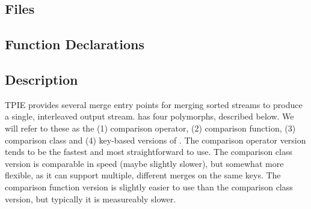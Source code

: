 
\subsection{Files}
  \btabb
     {}
  \etabb

\subsection{Function Declarations}
  \btabb
     {}
     {}
     {}
     {}
  \etabb

\subsection{Description}

TPIE provides several merge entry points for merging sorted streams to
produce a single, interleaved output stream.  has
four polymorphs, described below. We will refer to these as the (1)
comparison operator, (2) comparison function, (3) comparison class and (4) key-based
versions of . 
 The comparison operator version tends to
be the fastest and most straightforward to use. The
comparison class version is comparable in speed (maybe
slightly slower), but somewhat more flexible, as it can support
multiple, different merges on the same keys. The comparison
function version is slightly easier to use than the
comparison class version, but typically it is measureably slower.


